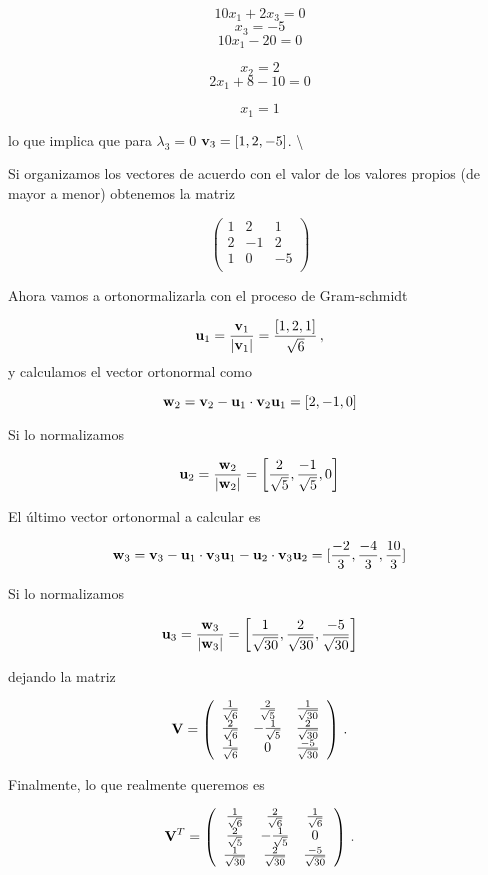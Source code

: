\documentclass[
]{agujournal2019}
\begin{document}
\[10x_1+2x_3=0\] \[x_3=-5\] \[10x_1-20=0\]

\[x_2=2\] \[2x_1+8-10=0\]

\[x_1=1\]

lo que implica que para \(\lambda_3=0\) \({\textbf v}_3=[1,2,-5]\).
\textbackslash{}

Si organizamos los vectores de acuerdo con el valor de los valores
propios (de mayor a menor) obtenemos la matriz

\[\left(\begin{array}{ccc}
  1 & 2 & 1 \\
  2 & -1 & 2\\
  1 & 0 & -5\\
      \end{array}\right)\]

Ahora vamos a ortonormalizarla con el proceso de Gram-schmidt

\[{\textbf u}_1=\frac{{\textbf v}_1}{|{\textbf v}_1|}=\frac{[1,2,1]}{\sqrt{6}}\,,\]
y calculamos el vector ortonormal como

\[{\textbf w}_2={\textbf v}_2-{\textbf u}_1\cdot{\textbf v}_2{\textbf u}_1=[2,-1,0]\]

Si lo normalizamos

\[{\textbf u}_2=\frac{{\textbf w}_2}{|{\textbf w}_2|}=\left[ \frac{2}{\sqrt{5}}, \frac{-1}{\sqrt{5}} , 0 \right]\]

El último vector ortonormal a calcular es

\[{\textbf w}_3={\textbf v}_3-{\textbf u}_1\cdot{\textbf v}_3{\textbf u}_1 - {\textbf u}_2\cdot{\textbf v}_3{\textbf u}_2=[\frac{-2}{3},\frac{-4}{3},\frac{10}{3}]\]

Si lo normalizamos

\[{\textbf u}_3=\frac{{\textbf w}_3}{|{\textbf w}_3|}=\left[ \frac{1}{\sqrt{30}}, \frac{2}{\sqrt{30}} , \frac{-5}{\sqrt{30}} \right]\]

dejando la matriz

\[{\textbf V}=\left(\begin{array}{ccc}
  \frac{1}{\sqrt{6}} & \frac{2}{\sqrt{5}} & \frac{1}{\sqrt{30}}\\
  \frac{2}{\sqrt{6}} & -\frac{1}{\sqrt{5}} & \frac{2}{\sqrt{30}}\\
  \frac{1}{\sqrt{6}} & 0 & \frac{-5}{\sqrt{30}}
      \end{array}\right)\,.\]

Finalmente, lo que realmente queremos es

\[{\textbf V}^T=\left(\begin{array}{ccc}
  \frac{1}{\sqrt{6}} & \frac{2}{\sqrt{6}} & \frac{1}{\sqrt{6}}\\
  \frac{2}{\sqrt{5}} & -\frac{1}{\sqrt{5}} & 0\\
  \frac{1}{\sqrt{30}} & \frac{2}{\sqrt{30}} & \frac{-5}{\sqrt{30}}\\
      \end{array}\right)\,.\]
\end{document}

